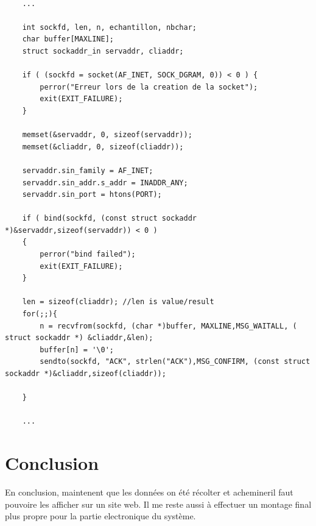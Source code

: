 \documentclass[11pt,french,a4paper]{article}
\begin{document}
\begin{scriptsize}
\begin{lstlisting}

	...

	int sockfd, len, n, echantillon, nbchar;
	char buffer[MAXLINE];
	struct sockaddr_in servaddr, cliaddr;
	
	if ( (sockfd = socket(AF_INET, SOCK_DGRAM, 0)) < 0 ) {
		perror("Erreur lors de la creation de la socket");
		exit(EXIT_FAILURE);
	}

	memset(&servaddr, 0, sizeof(servaddr));
	memset(&cliaddr, 0, sizeof(cliaddr));

	servaddr.sin_family = AF_INET; 
	servaddr.sin_addr.s_addr = INADDR_ANY;
	servaddr.sin_port = htons(PORT);

	if ( bind(sockfd, (const struct sockaddr *)&servaddr,sizeof(servaddr)) < 0 )
	{
		perror("bind failed");
		exit(EXIT_FAILURE);
	}

	len = sizeof(cliaddr); //len is value/result
	for(;;){
		n = recvfrom(sockfd, (char *)buffer, MAXLINE,MSG_WAITALL, ( struct sockaddr *) &cliaddr,&len);
		buffer[n] = '\0';
		sendto(sockfd, "ACK", strlen("ACK"),MSG_CONFIRM, (const struct sockaddr *)&cliaddr,sizeof(cliaddr));
	
	}

	...
\end{lstlisting}
\end{scriptsize}
\section{Conclusion}
En conclusion, maintenent que les données on été récolter et achemineril faut pouvoire les afficher sur un site web. Il me reste aussi à effectuer un montage final plus propre pour la partie electronique du système. 
\newpage
\listoffigures
\end{document}
